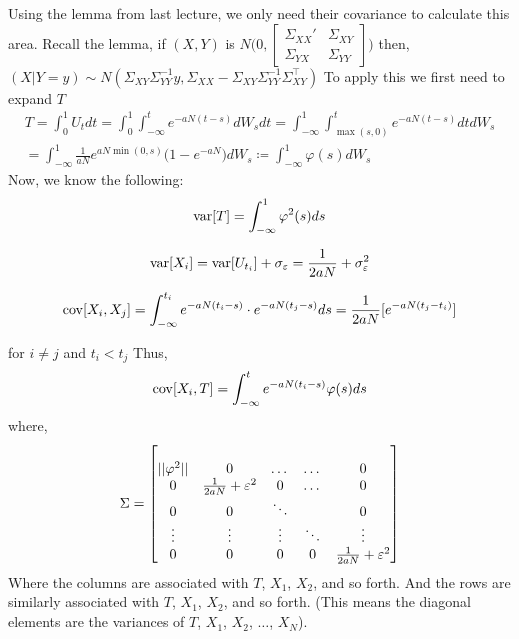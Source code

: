 \documentclass[../../../Master/AppliedStochastics.tex]{subfiles}
\begin{document}
Using the lemma from last lecture, 
we only need their covariance to calculate this area.
Recall the lemma,
if $(X,Y)$ is $N\Bigg(0, \begin{bmatrix} \Sigma_{XX}' & \Sigma_{XY} \\ 
\Sigma_{YX} & \Sigma_{YY}\end{bmatrix}\Bigg)$
then, $(X\vert Y=y) \sim N(\Sigma_{XY}\Sigma_{YY}^{-1}y, 
\Sigma_{XX}-\Sigma_{XY}\Sigma_{YY}^{-1}\Sigma_{XY}^{\intercal})$
To apply this we first need to expand $T$ 
$$\begin{aligned}
T = \int_{0}^{1} U_{t}dt = \int_{0}^{1}\int_{-\infty}^{t} e^{-aN(t-s)} dW_{s}dt 
=\int_{-\infty}^{1}\int_{\max(s,0)}^{t} e^{-aN(t-s)} dtdW_{s}\\
=\int_{-\infty}^{1} 
\frac{1}{aN}e^{aN\min(0,s)}\big(1-e^{-aN}\big)dW_{s}\coloneqq 
\int_{-\infty}^{1}\varphi(s)dW_{s}
\end{aligned}$$ 
Now, we know the following: 
$$\begin{aligned}
\operatorname{var}[T] = \int_{-\infty}^{1} \varphi^{2}(s) ds 
\end{aligned}$$ 

$$\begin{aligned}
\operatorname{var}[X_{i}] = \operatorname{var}[U_{t_{i}}] + \sigma_{\varepsilon} = \frac{1}{2aN} + 
\sigma_{\varepsilon}^2 
\end{aligned}$$ 

$$\begin{aligned}
\operatorname{cov}[X_{i}, X_{j}] = \int_{-\infty}^{t_{i}}e^{-aN(t_{i}-s)}\cdot 
e^{-aN(t_{j}-s)} ds = \frac{1}{2aN}[e^{-aN(t_{j}-t_{i})}]
\end{aligned}$$

for $i\neq j$ and $t_{i}<t_{j}$ 
Thus, 
$$\begin{aligned}
\operatorname{cov}[X_{i}, T] = \int_{-\infty}^{t} e^{-aN(t_{i}-s)}\varphi(s) ds 
\end{aligned}$$
where, 
$$\begin{aligned}
\Sigma = 
\begin{bmatrix}
&  &  &  &  \\
\vert\vert\varphi^2\vert\vert & 0 & \dotso & \dotso & 0 \\
0 & \frac{1}{2aN}+\varepsilon^2 & 0 & \dotso & 0 \\
0 & 0 & \ddots & \hfill & 0\\
\vdots & \vdots & \vdots & \ddots & \vdots \\
0 & 0 & 0 & 0 & \frac{1}{2aN}+\varepsilon^2
\end{bmatrix}
\end{aligned}$$
Where the columns are associated with $T$, $X_{1}$, $X_{2}$, and so forth. 
And the rows are similarly associated with $T$, $X_{1}$, $X_{2}$, and so forth. 
(This means the diagonal elements are the variances of $T$, $X_{1}$, $X_{2}$, 
$\dotso$, $X_N$).



%
\end{document}
